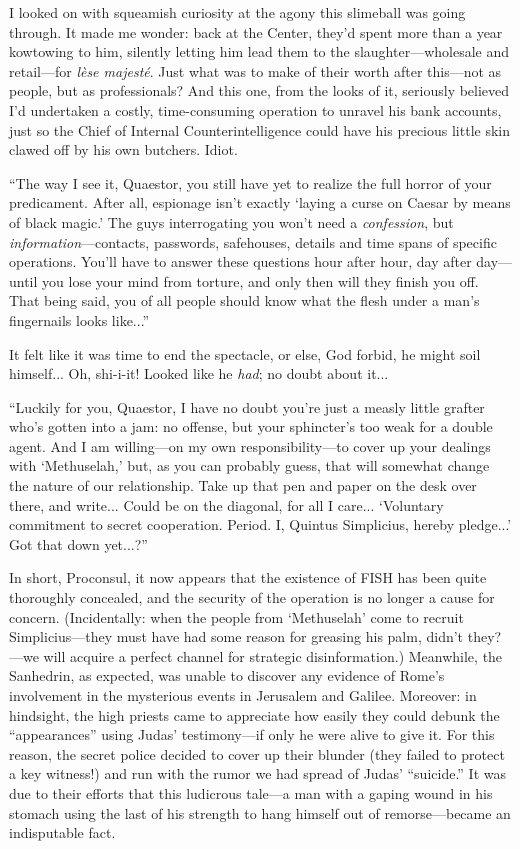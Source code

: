 I looked on with squeamish curiosity at the agony this slimeball was going through. It made me wonder: back at the Center, they'd spent more than a year kowtowing to him, silently letting him lead them to the slaughter---wholesale and retail---for \emph{lèse majesté}. Just what was to make of their worth after this---not as people, but as professionals? And this one, from the looks of it, seriously believed I'd undertaken a costly, time-consuming operation to unravel his bank accounts, just so the Chief of Internal Counterintelligence could have his precious little skin clawed off by his own butchers. Idiot.

``The way I see it, Quaestor, you still have yet to realize the full horror of your predicament. After all, espionage isn't exactly `laying a curse on Caesar by means of black magic.' The guys interrogating you won't need a \emph{confession}, but \emph{information}---contacts, passwords, safehouses, details and time spans of specific operations. You'll have to answer these questions hour after hour, day after day---until you lose your mind from torture, and only then will they finish you off. That being said, you of all people should know what the flesh under a man's fingernails looks like...''

It felt like it was time to end the spectacle, or else, God forbid, he might soil himself... Oh, shi-i-it! Looked like he \emph{had}; no doubt about it...

``Luckily for you, Quaestor, I have no doubt you're just a measly little grafter who's gotten into a jam: no offense, but your sphincter's too weak for a double agent. And I am willing---on my own responsibility---to cover up your dealings with `Methuselah,' but, as you can probably guess, that will somewhat change the nature of our relationship. Take up that pen and paper on the desk over there, and write... Could be on the diagonal, for all I care... `Voluntary commitment to secret cooperation. Period. I, Quintus Simplicius, hereby pledge...' Got that down yet...?''

In short, Proconsul, it now appears that the existence of FISH has been quite thoroughly concealed, and the security of the operation is no longer a cause for concern. (Incidentally: when the people from `Methuselah' come to recruit Simplicius---they must have had some reason for greasing his palm, didn't they?---we will acquire a perfect channel for strategic disinformation.) Meanwhile, the Sanhedrin, as expected, was unable to discover any evidence of Rome's involvement in the mysterious events in Jerusalem and Galilee. Moreover: in hindsight, the high priests came to appreciate how easily they could debunk the ``appearances'' using Judas' testimony---if only he were alive to give it. For this reason, the secret police decided to cover up their blunder (they failed to protect a key witness!) and run with the rumor we had spread of Judas' ``suicide.'' It was due to their efforts that this ludicrous tale---a man with a gaping wound in his stomach using the last of his strength to hang himself out of remorse---became an indisputable fact.

